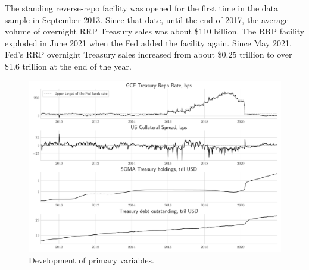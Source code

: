 \documentclass[11pt,a4paper,english,oneside]{article}
\begin{document}
The standing reverse-repo facility was opened for the first time in the data sample in September 2013. Since that date, until the end of 2017, the average volume of overnight RRP Treasury sales was about \$110 billion. The RRP facility exploded in June 2021 when the Fed added the facility again. Since May 2021, Fed's RRP overnight Treasury sales increased from about \$0.25 trillion to over \$1.6 trillion at the end of the year.

\begin{figure}[htb!]
  \begin{center}
    \caption{Development of primary variables.}
    \includegraphics[width=0.99\linewidth]{main_vars.pdf}
  \end{center}
  \label{fig:vars}
\end{figure}
\end{document}
